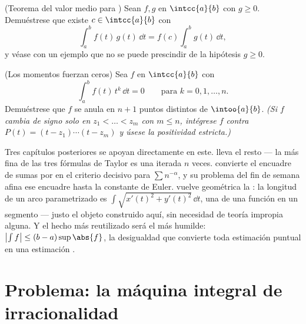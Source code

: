 \begin{exercise}[$\star\star$]\label{exo:b1:integration:11}
(Teorema del valor medio para ) Sean $f, g$  en
$\intcc{a}{b}$ con $g \geq 0$. Demuéstrese que existe
$c \in \intcc{a}{b}$ con
\[
\int_a^b f(t)\,g(t)\,\dd t = f(c)\int_a^b g(t)\,\dd t ,
\]
y véase con un ejemplo que no se puede prescindir de la hipótesis
$g \geq 0$.
\end{exercise}

\begin{exercise}[$\star\star\star$]\label{exo:b1:integration:12}
(Los momentos fuerzan ceros) Sea $f$  en $\intcc{a}{b}$ con
\[
\int_a^b f(t)\,t^k\,\dd t = 0 \qquad \text{para } k = 0, 1,
\dots, n .
\]
Demuéstrese que $f$ se anula en $n + 1$ puntos distintos de
$\intoo{a}{b}$. \emph{(Si $f$ cambia de signo solo en
$z_1 < \dots < z_m$ con $m \leq n$, intégrese $f$ contra
$P(t) = (t - z_1) \cdots (t - z_m)$ y úsese la positividad estricta.)}
\end{exercise}

\begin{remark}
Tres capítulos posteriores se apoyan directamente en este.
 lleva el resto  --- la más fina de las tres
fórmulas de Taylor es una  iterada $n$ veces.
 convierte el encuadre de sumas por  en el
criterio decisivo para $\sum n^{-\alpha}$, y su problema del fin de
semana afina ese encuadre hasta la constante de Euler.
 vuelve geométrica la : la longitud de un
arco parametrizado es $\int \sqrt{x'(t)^2 + y'(t)^2}\,\dd t$, una
 de una función  en un segmento --- justo el objeto
construido aquí, sin necesidad de teoría impropia alguna. Y el hecho
más reutilizado será el más humilde:
$\bigl|\int f\bigr| \leq (b - a)\sup\abs{f}$, la desigualdad que
convierte toda estimación puntual en una estimación .
\end{remark}

\section{Problema: la máquina integral de irracionalidad}

